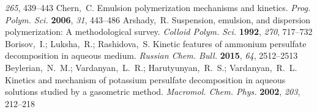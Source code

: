 \documentclass[journal=langd5,manuscript=article]{achemso}
\begin{document}
\begin{mcitethebibliography}{47}
  \emph{265}, 439--443\relax
\mciteBstWouldAddEndPuncttrue
\mciteSetBstMidEndSepPunct{\mcitedefaultmidpunct}
{\mcitedefaultendpunct}{\mcitedefaultseppunct}\relax
\EndOfBibitem
{}
Chern,~C. Emulsion polymerization mechanisms and kinetics. \emph{Prog. Polym.
  Sci.} \textbf{2006}, \emph{31}, 443--486\relax
\mciteBstWouldAddEndPuncttrue
\mciteSetBstMidEndSepPunct{\mcitedefaultmidpunct}
{\mcitedefaultendpunct}{\mcitedefaultseppunct}\relax
\EndOfBibitem
{}
Arshady,~R. Suspension, emulsion, and dispersion polymerization: A
  methodological survey. \emph{Colloid Polym. Sci.} \textbf{1992}, \emph{270},
  717--732\relax
\mciteBstWouldAddEndPuncttrue
\mciteSetBstMidEndSepPunct{\mcitedefaultmidpunct}
{\mcitedefaultendpunct}{\mcitedefaultseppunct}\relax
\EndOfBibitem
{}
Borisov,~I.; Luksha,~R.; Rashidova,~S. Kinetic features of ammonium persulfate
  decomposition in aqueous medium. \emph{Russian Chem. Bull.} \textbf{2015},
  \emph{64}, 2512--2513\relax
\mciteBstWouldAddEndPuncttrue
\mciteSetBstMidEndSepPunct{\mcitedefaultmidpunct}
{\mcitedefaultendpunct}{\mcitedefaultseppunct}\relax
\EndOfBibitem
{}
Beylerian,~N.~M.; Vardanyan,~L.~R.; Harutyunyan,~R.~S.; Vardanyan,~R.~L.
  Kinetics and mechanism of potassium persulfate decomposition in aqueous
  solutions studied by a gasometric method. \emph{Macromol. Chem. Phys.}
  \textbf{2002}, \emph{203}, 212--218\relax
\mciteBstWouldAddEndPuncttrue
\mciteSetBstMidEndSepPunct{\mcitedefaultmidpunct}
{\mcitedefaultendpunct}{\mcitedefaultseppunct}\relax
\EndOfBibitem
\end{mcitethebibliography}
\end{document}
